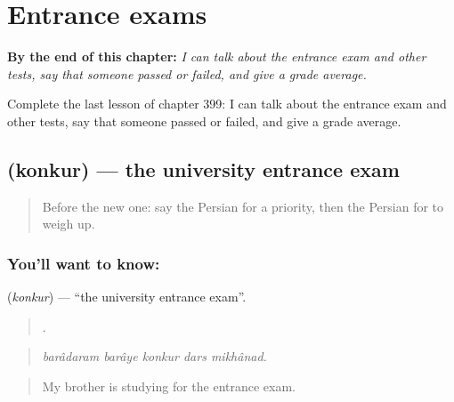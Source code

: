 
\chapter{Entrance exams}
\label{ch:fa-entrance-exams}

\begin{chapteropening}
\textbf{By the end of this chapter:} \emph{I can talk about the entrance exam and other tests, say that someone passed or failed, and give a grade average.}

Complete the last lesson of chapter 399: I can talk about the entrance exam and other tests, say that someone passed or failed, and give a grade average.
\end{chapteropening}

\section[\texorpdfstring{\fa{کنکور} (konkur)}{کنکور (konkur)}]{ (konkur) — the university entrance exam}

\label{lesson:FA-C399-konkur}



\begin{quote}
Before the new one: say the Persian for a priority, then the Persian for to weigh up.
\end{quote}

\subsection*{You'll want to know: }
\textbf{} (\emph{konkur}) — \textquotedblleft{}the university entrance exam\textquotedblright{}.

\begin{quote}
    .
\end{quote}

\begin{quote}
\emph{barâdaram barâye konkur dars mikhânad.}
\end{quote}

\begin{quote}
My brother is studying for the entrance exam.
\end{quote}

